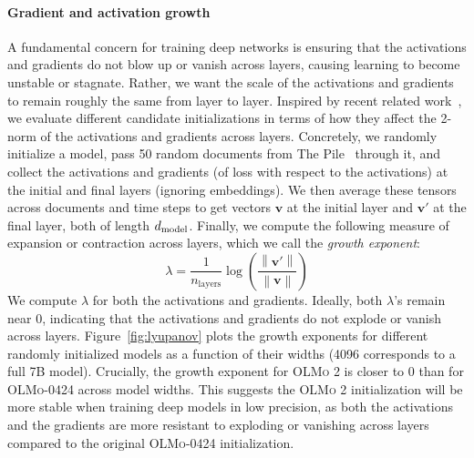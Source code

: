 \documentclass[table]{ai2style/ai2}
\newcommand{\norm}[1]{\left\lVert#1\right\rVert}
\newcommand{\olmoapril}{\textsc{OLMo-0424}\xspace}
\newcommand{\olmotoo}{\textsc{OLMo 2}\xspace}
\begin{document}
\paragraph{Gradient and activation growth} A fundamental concern for training deep networks is ensuring that the activations and gradients do not blow up or vanish across layers, causing learning to become unstable or stagnate.
Rather, we want the scale of the activations and gradients to remain roughly the same from layer to layer. 
Inspired by recent related work~\citep{cowsik2024geometric}, we evaluate different candidate initializations in terms of how they affect the 2-norm of the activations and gradients across layers.
Concretely, we randomly initialize a model, pass 50 random documents from The Pile~\citep{pile} through it, and collect the activations and gradients (of loss with respect to the activations) at the initial and final layers (ignoring embeddings). We then average these tensors across documents and time steps to get vectors $\pmb v$ at the initial layer and $\pmb{v'}$ at the final layer, both of length $d_{\mathrm{model}}$.
Finally, we compute the following measure of expansion or contraction across layers, which we call the \emph{growth exponent}:
\begin{equation*}
    \lambda = \frac{1}{n_\mathrm{layers}} \log \left( \frac{\norm{\pmb{v'}}}{\norm{\pmb v}} \right)
\end{equation*}
We compute $\lambda$ for both the activations and gradients. Ideally, both $\lambda$'s remain near 0, indicating that the activations and gradients do not explode or vanish across layers.
Figure~\ref{fig:lyupanov} plots the growth exponents for different randomly initialized models as a function of their widths (4096 corresponds to a full 7B model).
Crucially, the growth exponent for \olmotoo is closer to 0 than for \olmoapril across model widths. 
This suggests the \olmotoo initialization will be more stable when training deep models in low precision, as both the activations and the gradients are more resistant to exploding or vanishing across layers compared to the original \olmoapril initialization.
\end{document}
